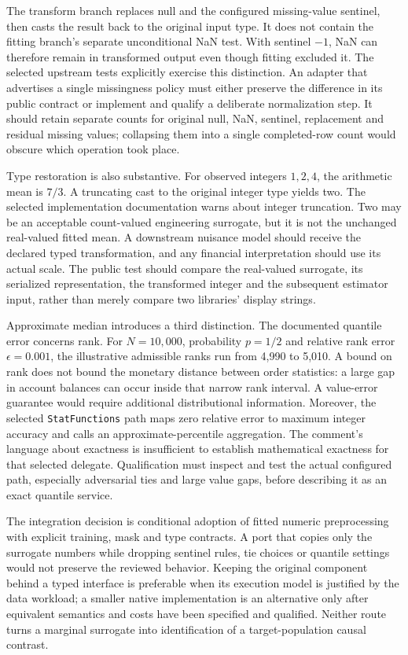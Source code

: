 The transform branch replaces null and the configured missing-value sentinel, then casts the result back to the original input type. It does not contain the fitting branch's separate unconditional NaN test. With sentinel $-1$, NaN can therefore remain in transformed output even though fitting excluded it. The selected upstream tests explicitly exercise this distinction. An adapter that advertises a single missingness policy must either preserve the difference in its public contract or implement and qualify a deliberate normalization step. It should retain separate counts for original null, NaN, sentinel, replacement and residual missing values; collapsing them into a single completed-row count would obscure which operation took place.\citep{exec25_otm_spark,exec25_otm_choice}

Type restoration is also substantive. For observed integers $1,2,4$, the arithmetic mean is $7/3$. A truncating cast to the original integer type yields two. The selected implementation documentation warns about integer truncation. Two may be an acceptable count-valued engineering surrogate, but it is not the unchanged real-valued fitted mean. A downstream nuisance model should receive the declared typed transformation, and any financial interpretation should use its actual scale. The public test should compare the real-valued surrogate, its serialized representation, the transformed integer and the subsequent estimator input, rather than merely compare two libraries' display strings.\citep{exec25_otm_spark,exec25_otm_choice}

Approximate median introduces a third distinction. The documented quantile error concerns rank. For $N=10{,}000$, probability $p=1/2$ and relative rank error $\epsilon=0.001$, the illustrative admissible ranks run from 4,990 to 5,010. A bound on rank does not bound the monetary distance between order statistics: a large gap in account balances can occur inside that narrow rank interval. A value-error guarantee would require additional distributional information. Moreover, the selected \texttt{StatFunctions} path maps zero relative error to maximum integer accuracy and calls an approximate-percentile aggregation. The comment's language about exactness is insufficient to establish mathematical exactness for that selected delegate. Qualification must inspect and test the actual configured path, especially adversarial ties and large value gaps, before describing it as an exact quantile service.\citep{exec25_otm_spark,exec25_otm_choice}

The integration decision is conditional adoption of fitted numeric preprocessing with explicit training, mask and type contracts. A port that copies only the surrogate numbers while dropping sentinel rules, tie choices or quantile settings would not preserve the reviewed behavior. Keeping the original component behind a typed interface is preferable when its execution model is justified by the data workload; a smaller native implementation is an alternative only after equivalent semantics and costs have been specified and qualified. Neither route turns a marginal surrogate into identification of a target-population causal contrast.\citep{exec25_otm_spark,exec25_otm_choice}

